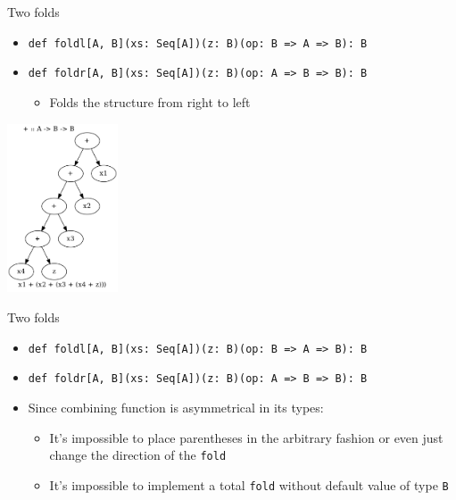 \documentclass[presentation,aspectratio=169,smaller]{beamer}
\begin{document}
\begin{frame}[label={sec:orga6a4105},fragile]{Two folds}
 \begin{itemize}
\item \texttt{def foldl[A, B](xs: Seq[A])(z: B)(op: B => A => B): B}
\item \texttt{def foldr[A, B](xs: Seq[A])(z: B)(op: A => B => B): B}
\begin{itemize}
\item Folds the structure from right to left
\end{itemize}
\end{itemize}

\pause

\begin{center}
\includegraphics[height=5cm]{.dot/foldr-1.png}
\end{center}
\end{frame}

\begin{frame}[label={sec:org752a525},fragile]{Two folds}
 \begin{itemize}
\item \texttt{def foldl[A, B](xs: Seq[A])(z: B)(op: B => A => B): B}
\item \texttt{def foldr[A, B](xs: Seq[A])(z: B)(op: A => B => B): B}
\item Since combining function is asymmetrical in its types:
\begin{itemize}
\item It’s impossible to place parentheses in the arbitrary fashion or even just
change the direction of the \texttt{fold}
\item It’s impossible to implement a total \texttt{fold} without default value of type \texttt{B}
\end{itemize}
\end{itemize}
\end{frame}
\end{document}
